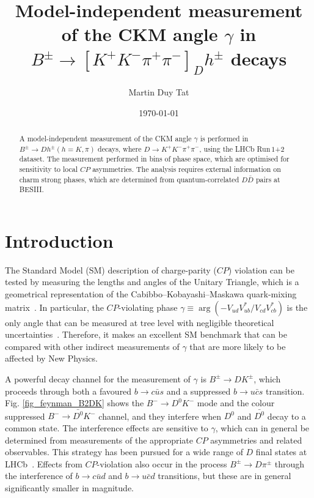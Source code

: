 \documentclass[12pt, a4paper, notitlepage, onecolumn]{article}
\title{Model-independent measurement of the CKM angle $\gamma$ in $B^\pm\to[K^+K^-\pi^+\pi^-]_Dh^\pm$ decays}
\author{Martin Duy Tat}
\date{\today}
\begin{document}
\maketitle
\begin{abstract}
\noindent A model-independent measurement of the CKM angle $\gamma$ is performed in $B^\pm\to Dh^\pm (h = K, \pi)$ decays, where $D\to K^+K^-\pi^+\pi^-$, using the LHCb Run\,$1$+$2$ dataset. The measurement performed in bins of phase space, which are optimised for sensitivity to local $C\!P$ asymmetries. The analysis requires external information on charm strong phases, which are determined from quantum-correlated $D\bar{D}$ pairs at BESIII.
\end{abstract}

\section{Introduction}
\noindent The Standard Model (SM) description of charge-parity ($C\!P$) violation can be tested by measuring the lengths and angles of the Unitary Triangle, which is a geometrical representation of the Cabibbo–Kobayashi–Maskawa quark-mixing matrix~\cite{Kobayashi:1973fv}. In particular, the $C\!P$-violating phase  $\gamma\equiv\arg(-V_{ud}V_{ub}^*/V_{cd}V_{cb}^*)$ is the only angle that can be measured at tree level with negligible theoretical uncertainties~\cite{Brod_2014}. Therefore, it makes an excellent SM benchmark that can be compared with other indirect measurements of $\gamma$ that are more likely to be affected by New Physics.

A powerful decay channel for the measurement of $\gamma$ is $B^\pm\to DK^\pm$, which proceeds through both a favoured $b\to c\bar{u}s$ and a suppressed $b\to u\bar{c}s$ transition. Fig. \ref{fig_feynman_B2DK} shows the $B^-\to D^0K^-$ mode and the colour suppressed $B^-\to\bar{D^0}K^-$ channel, and they interfere when $D^0$ and $\bar{D^0}$ decay to a common state. The interference effects are sensitive to $\gamma$, which can in general be determined from measurements of the appropriate $C\!P$ asymmetries and related observables. This strategy has been pursued for a wide range of $D$ final states at LHCb~\cite{LHCb-PAPER-2021-033}. Effects from $C\!P$-violation also occur in the process $B^\pm\to D\pi^\pm$ through the interference of $b\to c\bar{u}d$ and $b\to u\bar{c}d$ transitions, but these are in general significantly smaller in magnitude.
\end{document}

